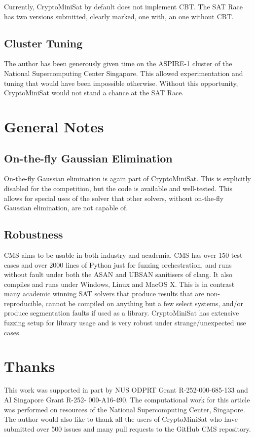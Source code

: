\documentclass[final]{ieee}
\begin{document}
Currently, CryptoMiniSat by default does not implement CBT. The SAT Race has two versions submitted, clearly marked, one with, an one without CBT.

\subsection{Cluster Tuning}
The author has been generously given time on the ASPIRE-1 cluster of the National Supercomputing Center Singapore\cite{nscc}. This allowed experimentation and tuning that would have been impossible otherwise. Without this opportunity, CryptoMiniSat would not stand a chance at the SAT Race.

\section{General Notes}
\subsection{On-the-fly Gaussian Elimination}
On-the-fly Gaussian elimination is again part of CryptoMiniSat. This is explicitly disabled for the competition, but the code is available and well-tested. This allows for special uses of the solver that other solvers, without on-the-fly Gaussian elimination, are not capable of.

\subsection{Robustness}
CMS aims to be usable in both industry and academia. CMS has over 150 test cases and over 2000 lines of Python just for fuzzing orchestration, and runs without fault under both the ASAN and UBSAN sanitisers of clang. It also compiles and runs under Windows, Linux and MacOS X. This is in contrast many academic winning SAT solvers that produce results that are non-reproducible, cannot be compiled on anything but a few select systems, and/or produce segmentation faults if used as a library. CryptoMiniSat has extensive fuzzing setup for library usage and is very robust under strange/unexpected use cases.

\section{Thanks}
This work was supported in part by NUS ODPRT Grant R-252-000-685-133 and AI Singapore Grant R-252- 000-A16-490. The computational work for this article was performed on resources of the National Supercomputing Center, Singapore\cite{nscc}. The author would also like to thank all the users of CryptoMiniSat who have submitted over 500 issues and many pull requests to the GitHub CMS repository\cite{CMS}.




\vfill
\pagebreak
\end{document}
